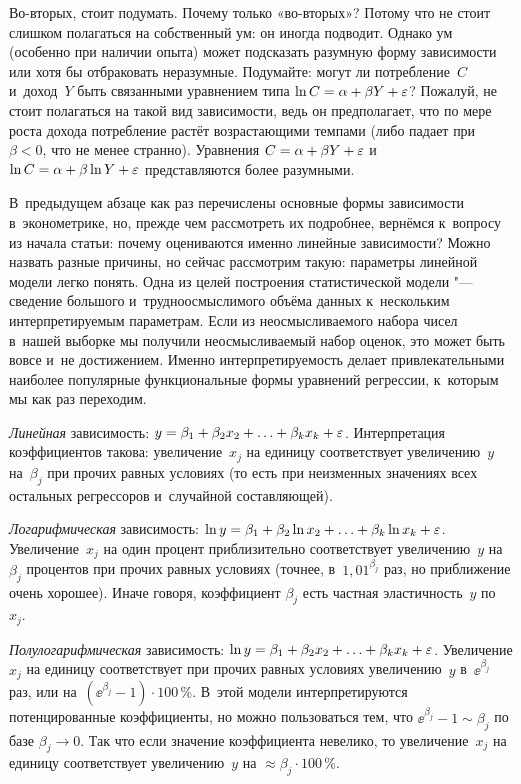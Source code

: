 \documentclass[final,pdftex]{../../template/epsilonj}
\begin{document}
Во-вторых, стоит подумать. Почему только «во-вторых»? Потому что не стоит слишком полагаться на собственный ум: он иногда подводит. Однако ум (особенно при наличии опыта) может подсказать разумную форму зависимости или хотя бы отбраковать неразумные. Подумайте: могут ли потребление~$C$ и~доход~$Y$ быть связанными уравнением типа $\ln C = \alpha + \beta Y + \varepsilon$? Пожалуй, не стоит полагаться на такой вид зависимости, ведь он предполагает, что по мере роста дохода потребление растёт возрастающими темпами (либо падает при $\beta<0$, что не менее странно). Уравнения $C = \alpha + \beta Y + \varepsilon$ и~$\ln C = \alpha + \beta \ln Y + \varepsilon$ представляются более разумными.

В~предыдущем абзаце как раз перечислены основные формы зависимости в~эконометрике, но, прежде чем рассмотреть их подробнее, вернёмся к~вопросу из начала статьи: почему оцениваются именно линейные зависимости? Можно назвать разные причины, но сейчас рассмотрим такую: параметры линейной модели легко понять. Одна из целей построения статистической модели "--- сведение большого и~трудноосмыслимого объёма данных к~нескольким интерпретируемым параметрам. Если из неосмысливаемого набора чисел в~нашей выборке мы получили неосмысливаемый набор оценок, это может быть вовсе и~не достижением. Именно интерпретируемость делает привлекательными наиболее популярные функциональные формы уравнений регрессии, к~которым мы как раз переходим.

\textit{Линейная} зависимость: $y = \beta_1 + \beta_2 x_2 + \ldots + \beta_k x_k + \varepsilon$. Интерпретация коэффициентов такова: увеличение~$x_j$ на единицу соответствует увеличению~$y$ на~$\beta_j$ при прочих равных условиях (то есть при неизменных значениях всех остальных регрессоров и~случайной составляющей). 

\textit{Логарифмическая} зависимость: $\ln y = \beta_1 + \beta_2 \ln x_2 + \ldots + \beta_k \ln x_k + \varepsilon$. Увеличение~$x_j$ на один процент приблизительно соответствует увеличению~$y$ на~$\beta_j$ процентов при прочих равных условиях (точнее, в~$1{,}01^{\beta_j}$ раз, но приближение очень хорошее). Иначе говоря, коэффициент $\beta_j$ есть частная эластичность~$y$ по~$x_j$.

\textit{Полулогарифмическая }зависимость: $\ln y = \beta_1 + \beta_2 x_2 + \ldots + \beta_k x_k + \varepsilon$. Увеличение $x_j$ на единицу соответствует при прочих равных условиях увеличению~$y$ в~$\ee^{\beta_j}$ раз, или на~$(\ee^{\beta_j}-1)\cdot 100\,\%$. В~этой модели интерпретируются потенцированные коэффициенты, но можно пользоваться тем, что $\ee^{\beta_j} - 1 \sim \beta_j$ по базе $\beta_j \to 0$. Так что если значение коэффициента невелико, то увеличение~$x_j$ на единицу соответствует увеличению~$y$ на $\approx \beta_j \cdot 100\,\%$.
\end{document}
